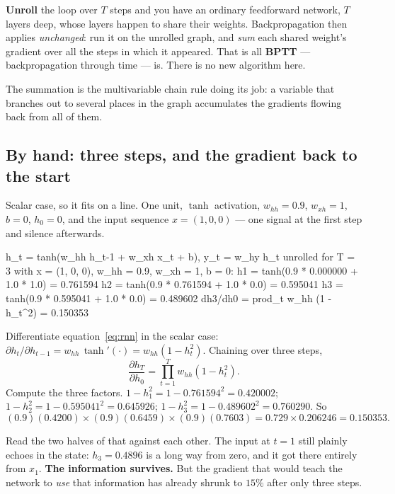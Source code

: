 \documentclass[11pt]{article}
\begin{document}
\begin{keyidea}
\textbf{Unroll} the loop over $T$ steps and you have an ordinary feedforward
network, $T$ layers deep, whose layers happen to share their weights.
Backpropagation then applies \emph{unchanged}: run it on the unrolled graph,
and \emph{sum} each shared weight's gradient over all the steps in which it
appeared. That is all \textbf{BPTT} --- backpropagation through time --- is.
There is no new algorithm here.
\end{keyidea}

The summation is the multivariable chain rule doing its job: a variable that
branches out to several places in the graph accumulates the gradients flowing
back from all of them.

\subsection{By hand: three steps, and the gradient back to the start}

Scalar case, so it fits on a line. One unit, $\tanh$ activation,
$w_{hh} = 0.9$, $w_{xh} = 1$, $b = 0$, $h_0 = 0$, and the input sequence
$x = (1, 0, 0)$ --- one signal at the first step and silence afterwards.

\begin{codeout}
h_t = tanh(w_hh h_{t-1} + w_xh x_t + b),   y_t = w_hy h_t
unrolled for T = 3 with x = (1, 0, 0), w_hh = 0.9, w_xh = 1, b = 0:
   h1 = tanh(0.9 * 0.000000 + 1.0 * 1.0) = 0.761594
   h2 = tanh(0.9 * 0.761594 + 1.0 * 0.0) = 0.595041
   h3 = tanh(0.9 * 0.595041 + 1.0 * 0.0) = 0.489602
dh3/dh0 = prod_t w_hh (1 - h_t^2) = 0.150353
\end{codeout}

\begin{worked}
Differentiate equation~\eqref{eq:rnn} in the scalar case:
$\partial h_t/\partial h_{t-1} = w_{hh}\,\tanh'(\cdot) = w_{hh}(1 - h_t^2)$.
Chaining over three steps,
\[
  \frac{\partial h_T}{\partial h_0} = \prod_{t=1}^{T} w_{hh}(1 - h_t^2).
\]
Compute the three factors. $1 - h_1^2 = 1 - 0.761594^2 = 0.420002$;
$1 - h_2^2 = 1 - 0.595041^2 = 0.645926$; $1 - h_3^2 = 1 - 0.489602^2 =
0.760290$. So
\[
  (0.9)(0.4200)\times(0.9)(0.6459)\times(0.9)(0.7603)
  = 0.729 \times 0.206246 = \mathbf{0.150353}.
\]
\end{worked}

Read the two halves of that against each other. The input at $t = 1$ still
plainly echoes in the state: $h_3 = 0.4896$ is a long way from zero, and it
got there entirely from $x_1$. \textbf{The information survives.} But the
gradient that would teach the network to \emph{use} that information has
already shrunk to $15\%$ after only three steps.
\end{document}
